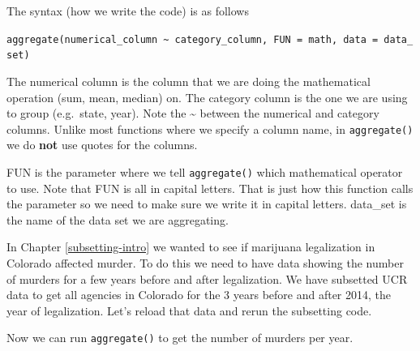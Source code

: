 \documentclass[
  12pt,
]{book}
\newenvironment{Shaded}{\begin{snugshade}}{\end{snugshade}}
\newcommand{\DecValTok}[1]{\textcolor[rgb]{0.06,0.06,0.06}{#1}}
\newcommand{\KeywordTok}[1]{\textcolor[rgb]{0.27,0.27,0.27}{\textbf{#1}}}
\newcommand{\NormalTok}[1]{#1}
\newcommand{\OperatorTok}[1]{\textcolor[rgb]{0.43,0.43,0.43}{\textbf{#1}}}
\newcommand{\StringTok}[1]{\textcolor[rgb]{0.5,0.5,0.5}{#1}}
\begin{document}
The syntax (how we write the code) is as follows

\texttt{aggregate(numerical\_column\ \textasciitilde{}\ category\_column,\ FUN\ =\ math,\ data\ =\ data\_set)}

The numerical column is the column that we are doing the mathematical operation (sum, mean, median) on. The category column is the one we are using to group (e.g.~state, year). Note the \textasciitilde{} between the numerical and category columns. Unlike most functions where we specify a column name, in \texttt{aggregate()} we do \textbf{not} use quotes for the columns.

FUN is the parameter where we tell \texttt{aggregate()} which mathematical operator to use. Note that FUN is all in capital letters. That is just how this function calls the parameter so we need to make sure we write it in capital letters. data\_set is the name of the data set we are aggregating.

In Chapter \ref{subsetting-intro} we wanted to see if marijuana legalization in Colorado affected murder. To do this we need to have data showing the number of murders for a few years before and after legalization. We have subsetted UCR data to get all agencies in Colorado for the 3 years before and after 2014, the year of legalization. Let's reload that data and rerun the subsetting code.

\begin{Shaded}
\end{Shaded}

Now we can run \texttt{aggregate()} to get the number of murders per year.
\end{document}
